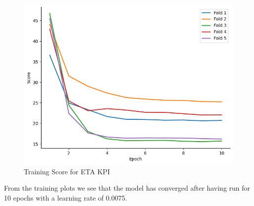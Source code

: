 \documentclass{report} %
\begin{document}
\begin{figure}[H]
    \hfill
    \begin{minipage}[b]{0.325\textwidth}
        \includegraphics[width=\textwidth]{./ReportImages/train_score_y2.png}
        \caption{\centering Training Score for ETA \ac{KPI}}
        \label{fig:Training Score for ETA grid}
    \end{minipage}
\end{figure}

From the training plots we see that the model has converged after having run for 10 epochs with a learning rate of 0.0075.
\end{document}
